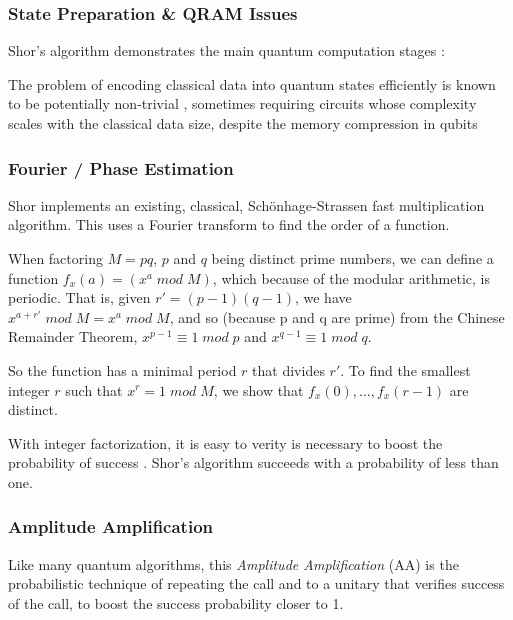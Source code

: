 \subsubsection{State Preparation \& QRAM Issues}

Shor's algorithm demonstrates the main quantum computation stages \cite{Nielsen:2010}:

The problem of encoding classical data into quantum states efficiently is known to be potentially non-trivial \cite{Tavakoli:2015}, 
sometimes requiring circuits whose complexity scales with the classical data size, despite the memory compression in qubits

\subsubsection{Fourier / Phase Estimation}

Shor implements an existing, classical, Sch\"{o}nhage-Strassen fast multiplication algorithm.
This uses a Fourier transform  to find the order of a function.  

When factoring $M = pq$, $p$ and $q$ being distinct prime numbers,
we can define a function $f_x(a) = (x^a\;mod\;M)$, which because of the modular arithmetic, is periodic.
That is, given $r' = (p-1)(q-1)$, we have $x^{a+r'}\;mod\;M = x^a\;mod\;M$, and so (because p and q are prime)  
from the Chinese Remainder Theorem, $x^{p-1} \equiv 1\;mod\;p$ and  $x^{q-1} \equiv 1\;mod\;q$.

So the function has a minimal period $r$ that divides $r'$.  
To find the smallest integer $r$ such that $x^r = 1\;mod\;M$, 
we show that $f_x(0),..., f_x(r-1)$ are distinct.  

With integer factorization, it is easy to verity is necessary to boost the probability of success \cite{Lipton:2021}.
Shor's algorithm succeeds with a probability of less than one.


\subsubsection{Amplitude Amplification}

Like many quantum algorithms, this 
\emph{Amplitude Amplification} (AA) \cite{Dalzell:2023} is the probabilistic technique of 
repeating the call and to a unitary that verifies success of the call, to boost the success probability
closer to 1.

